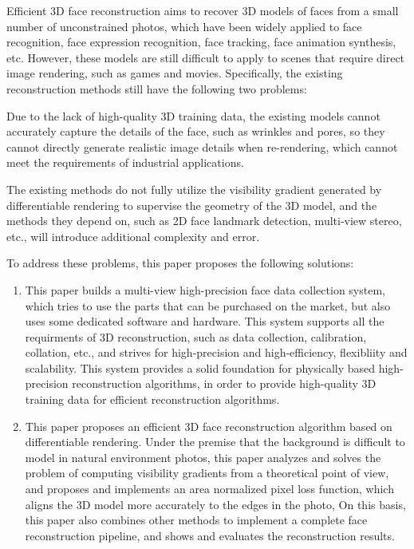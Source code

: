 \documentclass{scutmaster}
\begin{document}
Efficient 3D face reconstruction aims to recover 3D models of faces from a small number of unconstrained photos,
which have been widely applied to face recognition, face expression recognition, face tracking, face animation synthesis, etc.
However, these models are still difficult to apply to scenes that require direct image rendering, such as games and movies.
Specifically, the existing reconstruction methods still have the following two problems:
\begin{enumerate*}
\item Due to the lack of high-quality 3D training data, the existing models cannot accurately capture the details of the face,
such as wrinkles and pores,
so they cannot directly generate realistic image details when re-rendering, which cannot meet the requirements of industrial applications.
\item The existing methods do not fully utilize the visibility gradient generated by differentiable rendering to supervise the geometry of the 3D model,
and the methods they depend on, such as 2D face landmark detection, multi-view stereo, etc., will introduce additional complexity and error.
\end{enumerate*}

To address these problems, this paper proposes the following solutions:
\begin{enumerate}
\item This paper builds a multi-view high-precision face data collection system,
which tries to use the parts that can be purchased on the market,
but also uses some dedicated software and hardware.
This system supports all the requirments of 3D reconstruction, such as data collection, calibration, collation, etc.,
and strives for high-precision and high-efficiency, flexibliity and scalability.
This system provides a solid foundation for physically based high-precision reconstruction algorithms,
in order to provide high-quality 3D training data for efficient reconstruction algorithms.
\item This paper proposes an efficient 3D face reconstruction algorithm based on differentiable rendering.
Under the premise that the background is difficult to model in natural environment photos, this paper analyzes and solves the problem of computing visibility gradients from a theoretical point of view,
and proposes and implements an area normalized pixel loss function,
which aligns the 3D model more accurately to the edges in the photo,
On this basis, this paper also combines other methods to implement a complete face reconstruction pipeline,
and shows and evaluates the reconstruction results.
\end{enumerate}
\end{document}
